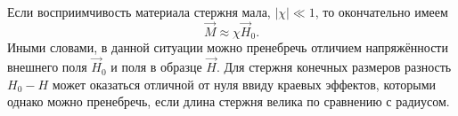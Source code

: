 Если восприимчивость материала стержня мала, $|\chi|\ll 1$, то окончательно
имеем
\[
\vec M \approx \chi \vec{H}_0.
\]
Иными словами, в данной ситуации можно пренебречь отличием напряжённости
внешнего поля $\vec H_0$ и поля в образце $\vec H$. Для стержня конечных
размеров разность $H_0 -H$ может оказаться отличной от нуля ввиду краевых
эффектов, которыми однако можно пренебречь, если длина стержня велика по сравнению
с радиусом.



%
%
%



